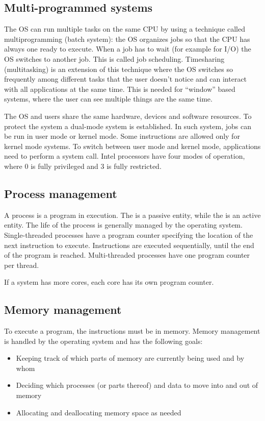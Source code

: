 \subsection{Multi-programmed systems}

The OS can run multiple tasks on the same CPU by using a technique called multiprogramming (batch system): the OS organizes jobs so that the CPU has always one ready to execute. When a job has to wait (for example for I/O) the OS switches to another job. This is called job scheduling. Timesharing (multitasking) is an extension of this technique where the OS switches so frequently among different tasks that the user doesn't notice and can interact with all applications at the same time. This is needed for ``window'' based systems, where the user can see multiple things are the same time.


The OS and users share the same hardware, devices and software resources. To protect the system a dual-mode system is established. In such system, jobs can be run in user mode or kernel mode. Some instructions are allowed only for kernel mode systems. To switch between user mode and kernel mode, applications need to perform a system call. Intel processors have four modes of operation, where 0 is fully privileged and 3 is fully restricted.

\subsection{Process management}

A process is a program in execution. The  is a passive entity, while the  is an active entity. The life of the process is generally managed by the operating system. Single-threaded processes have a program counter specifying the location of the next instruction to execute. Instructions are executed sequentially, until the end of the program is reached. Multi-threaded processes have one program counter per thread.

If a system has more cores, each core has its own program counter.

\subsection{Memory management}

To execute a program, the instructions must be in memory. Memory management is handled by the operating system and has the following goals:
\begin{itemize}
  \item Keeping track of which parts of memory are currently being used and by
  whom
  \item Deciding which processes (or parts thereof) and data to move into and
  out of memory
  \item Allocating and deallocating memory space as needed
\end{itemize}

